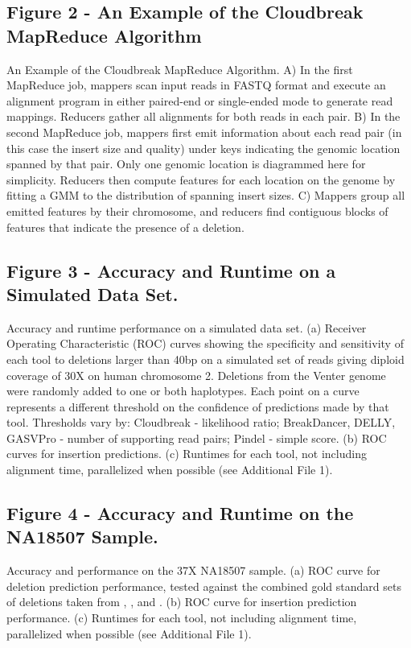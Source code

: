 \documentclass[10pt]{bmc_article}
\newenvironment{bmcformat}{\fussy\setboolean{publ}{true}}{\fussy}
\begin{document}
\begin{bmcformat}
  \subsection*{Figure 2 - An Example of the Cloudbreak MapReduce Algorithm}
An Example of the Cloudbreak MapReduce Algorithm. A) In the first MapReduce job, mappers scan input reads in FASTQ format and execute an alignment program in either paired-end or single-ended mode to generate read mappings. Reducers gather all alignments for both reads in each pair. B) In the second MapReduce job, mappers first emit information about each read pair (in this case the insert size and quality) under keys indicating the genomic location spanned by that pair. Only one genomic location is diagrammed here for simplicity. Reducers then compute features for each location on the genome by fitting a GMM to the distribution of spanning insert sizes. C) Mappers group all emitted features by their chromosome, and reducers find contiguous blocks of features that indicate the presence of a deletion.

  \subsection*{Figure 3 - Accuracy and Runtime on a Simulated Data Set.}
Accuracy and runtime performance on a simulated data set. (a) Receiver Operating Characteristic (ROC) curves showing the specificity and sensitivity of each tool to deletions larger than 40bp on a simulated set of reads giving diploid coverage of 30X on human chromosome 2. Deletions from the Venter genome were randomly added to one or both haplotypes. Each point on a curve represents a different threshold on the confidence of predictions made by that tool. Thresholds vary by: Cloudbreak - likelihood ratio; BreakDancer, DELLY, GASVPro - number of supporting read pairs; Pindel - simple score. (b) ROC curves for insertion predictions. (c) Runtimes for each tool, not including alignment time, parallelized when possible (see Additional File 1).

\subsection*{Figure 4 - Accuracy and Runtime on the NA18507 Sample.}
Accuracy and performance on the 37X NA18507 sample. (a) ROC curve for deletion prediction performance, tested against the combined gold standard sets of deletions taken from \cite{Kidd:2008p926}, \cite{Mills:2011fi}, and \cite{GenomesProjectConsortium:2012co}. (b) ROC curve for insertion prediction performance. (c) Runtimes for each tool, not including alignment time, parallelized when possible (see Additional File 1). 


\end{bmcformat}
\end{document}

